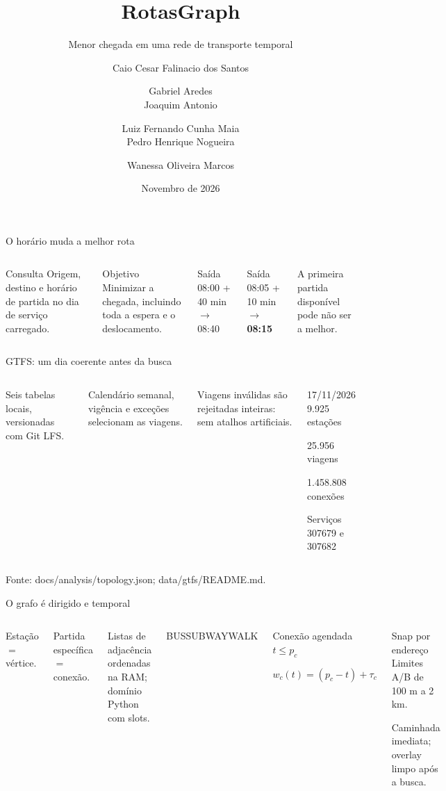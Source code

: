 \documentclass[aspectratio=169,11pt]{beamer}
\title{RotasGraph}
\subtitle{Menor chegada em uma rede de transporte temporal}
\author{Caio Cesar Falinacio dos Santos \and Gabriel Aredes\\Joaquim Antonio \and Luiz Fernando Cunha Maia\\Pedro Henrique Nogueira \and Wanessa Oliveira Marcos}
\institute{Engenharia de Software -- PUC Minas\\Teoria dos Grafos e Computabilidade\\Professor Leonardo Vilela Cardoso}
\date{Novembro de 2026}
\begin{document}
\begin{frame}\titlepage\end{frame}
\begin{frame}{O horário muda a melhor rota}
\begin{columns}[T]
\begin{block}{Consulta}
Origem, destino e horário de partida no dia de serviço carregado.
\end{block}
\begin{block}{Objetivo}
Minimizar a chegada, incluindo toda a espera e o deslocamento.
\end{block}
Saída 08:00 + 40 min $\rightarrow$ 08:40\par\medskip
Saída 08:05 + 10 min $\rightarrow$ \textbf{08:15}\par\medskip
A primeira partida disponível pode não ser a melhor.
\end{columns}
\end{frame}
\begin{frame}{GTFS: um dia coerente antes da busca}
\begin{columns}[T]
Seis tabelas locais, versionadas com Git LFS.\par\medskip
Calendário semanal, vigência e exceções selecionam as viagens.\par\medskip
Viagens inválidas são rejeitadas inteiras: sem atalhos artificiais.
\begin{block}{17/11/2026}
9.925 estações\par
25.956 viagens\par
1.458.808 conexões\par\medskip
Serviços 307679 e 307682
\end{block}
\end{columns}
\vfill\tiny Fonte: docs/analysis/topology.json; data/gtfs/README.md.
\end{frame}
\begin{frame}{O grafo é dirigido e temporal}
\begin{columns}[T]
Estação $=$ vértice.\par\medskip
Partida específica $=$ conexão.\par\medskip
Listas de adjacência ordenadas na RAM; domínio Python com slots.\par\medskip
\textcolor{bus}{BUS}\quad\textcolor{subway}{SUBWAY}\quad\textcolor{walk}{WALK}
\begin{block}{Conexão agendada}
$t\leq p_c$\par
$w_c(t)=(p_c-t)+\tau_c$
\end{block}
\begin{block}{Snap por endereço}
Limites A/B de 100 m a 2 km.\par
Caminhada imediata; overlay limpo após a busca.
\end{block}
\end{columns}
\end{frame}
\end{document}
